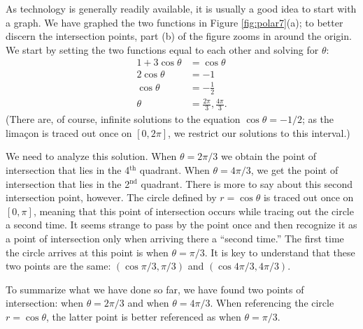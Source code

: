 {As technology is generally readily available, it is usually a good idea to start with a graph. We have graphed the two functions in Figure \ref{fig:polar7}(a); to better discern the intersection points, part (b) of the figure zooms in around the origin.
We start by setting the two functions equal to each other and solving for $\theta$:
\begin{align*}
1+3\cos\theta &= \cos \theta \\
2\cos\theta &= -1\\
\cos\theta&= -\frac12\\
\theta &= \frac{2\pi}{3}, \frac{4\pi}{3}.
\end{align*}
(There are, of course, infinite solutions to the equation $\cos\theta=-1/2$; as the lima\c con is traced out once on $[0,2\pi]$, we restrict our solutions to this interval.) 

We need to analyze this solution. When $\theta = 2\pi/3$ we obtain the point of intersection that lies in the 4$^\text{th}$ quadrant. When $\theta = 4\pi/3$, we get the point of intersection that lies in the 2$^\text{nd}$ quadrant. There is more to say about this second intersection point, however. The circle defined by $r=\cos\theta$ is traced out once on $[0,\pi]$, meaning that this point of intersection occurs while tracing out the circle a second time. It seems strange to pass by the point once and then recognize it as a point of intersection only when arriving there a ``second time.'' The first time the circle arrives at this point is when $\theta = \pi/3$.
It is key to understand that these two points are the same: $(\cos \pi/3,\pi/3)$ and $(\cos 4\pi/3,4\pi/3)$. 

To summarize what we have done so far, we have found two points of intersection: when $\theta=2\pi/3$ and when $\theta=4\pi/3$. When referencing the circle $r=\cos \theta$, the latter point is better referenced as when $\theta=\pi/3$.

}
